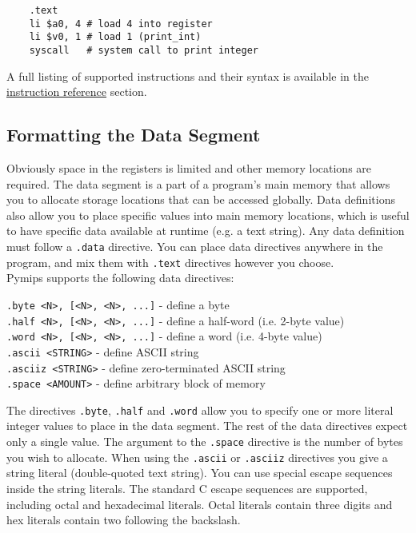 \documentclass[12pt]{article}
\begin{document}
\begin{lstlisting}
    .text
    li $a0, 4 # load 4 into register
    li $v0, 1 # load 1 (print_int)
    syscall   # system call to print integer
\end{lstlisting}

A full listing of supported instructions and their syntax is available in the
     \hyperref[sec:iref]{instruction reference} section.\\

\subsection{Formatting the Data Segment}

Obviously space in the registers is limited and other memory locations are
     required. The data segment is a part of a program's main memory that allows
     you to allocate storage locations that can be accessed globally. Data
     definitions also allow you to place specific values into main memory
     locations, which is useful to have specific data available at runtime
     (e.g. a text string). Any data definition must follow a \texttt{.data}
     directive. You can place data directives anywhere in the program, and mix
     them with \texttt{.text} directives however you choose.\\

Pymips supports the following data directives:\\

\begin{addmargin}[0.5in]{0.5in}
    \texttt{.byte <N>, [<N>, <N>, ...]} - define a byte\\
    \texttt{.half <N>, [<N>, <N>, ...]} - define a half-word (i.e. 2-byte value)\\
    \texttt{.word <N>, [<N>, <N>, ...]} - define a word (i.e. 4-byte value)\\
    \texttt{.ascii <STRING>} - define ASCII string\\
    \texttt{.asciiz <STRING>} - define zero-terminated ASCII string\\
    \texttt{.space <AMOUNT>} - define arbitrary block of memory\\
\end{addmargin}

The directives \texttt{.byte}, \texttt{.half} and \texttt{.word} allow you to
     specify one or more literal integer values to place in the data
     segment. The rest of the data directives expect only a single value. The
     argument to the \texttt{.space} directive is the number of bytes you wish
     to allocate. When using the \texttt{.ascii} or \texttt{.asciiz} directives
     you give a string literal (double-quoted text string). You can use special
     escape sequences inside the string literals. The standard C escape
     sequences are supported, including octal and hexadecimal literals. Octal
     literals contain three digits and hex literals contain two following the
     backslash.\\
\end{document}
